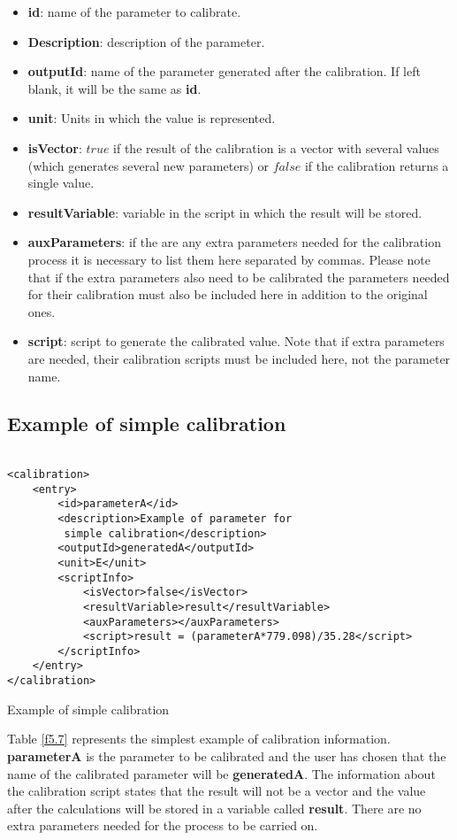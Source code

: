 \begin{itemize}
\item \textbf{id}: name of the parameter to calibrate.
\item \textbf{Description}: description of the parameter.
\item \textbf{outputId}: name of the parameter generated after the calibration. If left blank, it will be the same as \textbf{id}.
\item \textbf{unit}: Units in which the value is represented.
\item \textbf{isVector}: $true$ if the result of the calibration is a vector with several values (which generates several new parameters) or $false$ if the calibration returns a single value.
\item \textbf{resultVariable}: variable in the script in which the result will be stored.
\item \textbf{auxParameters}: if the are any extra parameters needed for the calibration process it is necessary to list them here separated by commas. Please note that if the extra parameters also need to be calibrated the parameters needed for their calibration must also be included here in addition to the original ones.
\item \textbf{script}: script to generate the calibrated value. Note that if extra parameters are needed, their calibration scripts must be included here, not the parameter name. 
\end{itemize}

\subsection{Example of simple calibration}

\begin{table}[H]
\lstset{language=XML}
\begin{lstlisting}

<calibration>
	<entry>
		<id>parameterA</id>
		<description>Example of parameter for
		 simple calibration</description>
		<outputId>generatedA</outputId> 
		<unit>E</unit>
		<scriptInfo>
			<isVector>false</isVector>
			<resultVariable>result</resultVariable>
			<auxParameters></auxParameters>
			<script>result = (parameterA*779.098)/35.28</script>
		</scriptInfo>
	</entry>
</calibration>
\end{lstlisting}
\caption{Example of simple calibration}
\label{Table5.7}
\end{table}

Table \ref{f5.7} represents the simplest example of calibration information. \textbf{parameterA} is the parameter to be calibrated and the user has chosen that the name of the calibrated parameter will be \textbf{generatedA}. The information about the calibration script states that the result will not be a vector and the value after the calculations will be stored in a variable called \textbf{result}. There are no extra parameters needed for the process to be carried on.

